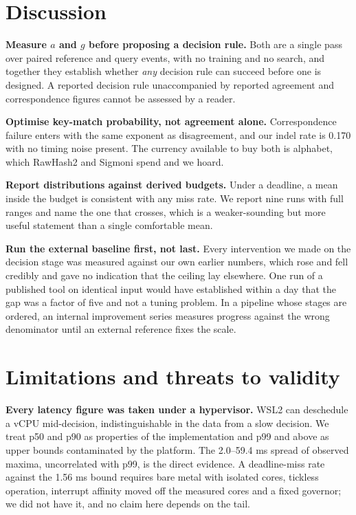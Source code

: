 \documentclass[sigconf,nonacm]{acmart}
\begin{document}
\section{Discussion}

\textbf{Measure $a$ and $g$ before proposing a decision rule.} Both are a single pass over
paired reference and query events, with no training and no search, and together they establish
whether \emph{any} decision rule can succeed before one is designed. A reported decision rule
unaccompanied by reported agreement and correspondence figures cannot be assessed by a reader.

\textbf{Optimise key-match probability, not agreement alone.} Correspondence failure enters with
the same exponent as disagreement, and our indel rate is 0.170 with no timing noise present. The
currency available to buy both is alphabet, which RawHash2 and Sigmoni spend and we hoard.

\textbf{Report distributions against derived budgets.} Under a deadline, a mean inside the budget
is consistent with any miss rate. We report nine runs with full ranges and name the one that
crosses, which is a weaker-sounding but more useful statement than a single comfortable mean.

\textbf{Run the external baseline first, not last.} Every intervention we made on the decision
stage was measured against our own earlier numbers, which rose and fell credibly and gave no
indication that the ceiling lay elsewhere. One run of a published tool on identical input would
have established within a day that the gap was a factor of five and not a tuning problem. In a
pipeline whose stages are ordered, an internal improvement series measures progress against the
wrong denominator until an external reference fixes the scale.

\section{Limitations and threats to validity}
\label{sec:limits}

\textbf{Every latency figure was taken under a hypervisor.} WSL2 can deschedule a vCPU
mid-decision, indistinguishable in the data from a slow decision. We treat p50 and p90 as
properties of the implementation and p99 and above as upper bounds contaminated by the platform.
The 2.0--59.4 ms spread of observed maxima, uncorrelated with p99, is the direct evidence. A
deadline-miss rate against the 1.56 ms bound requires bare metal with isolated cores, tickless
operation, interrupt affinity moved off the measured cores and a fixed governor; we did not have
it, and no claim here depends on the tail.
\end{document}
